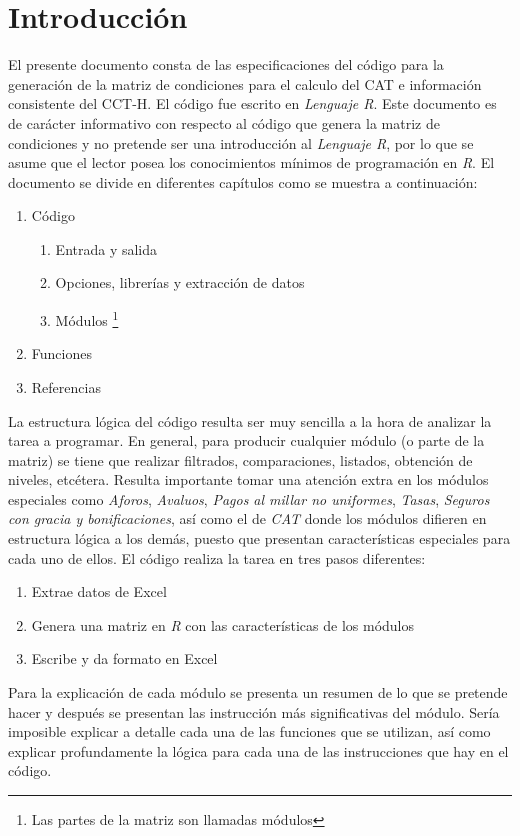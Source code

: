 \documentclass{report}
\begin{document}
\chapter{Introducción} 
% 
El presente documento consta de las especificaciones del código para la generación de la matriz de condiciones para el calculo del CAT e información consistente del CCT-H. El código fue escrito en \textit{Lenguaje R}. 
Este documento es de carácter informativo con respecto al código que genera la matriz de condiciones y no pretende ser una introducción al \textit{Lenguaje R}, por lo que se asume que el lector posea los conocimientos mínimos de programación en \textit{R}. El documento se divide en diferentes capítulos como se muestra a continuación:
\begin{enumerate}
    \item Código
    \begin{enumerate}
        \item Entrada y salida
        \item Opciones, librerías y extracción de datos
        \item Módulos \footnote[1]{Las partes de la matriz son llamadas módulos}
    \end{enumerate}
    \item Funciones
    \item Referencias
\end{enumerate}
La estructura lógica del código resulta ser muy sencilla a la hora de analizar la tarea a programar. En general, para producir cualquier módulo (o parte de la matriz) se tiene que realizar filtrados, comparaciones, listados, obtención de niveles, etcétera. Resulta importante tomar una atención extra en los módulos especiales como \textit{Aforos}, \textit{Avaluos}, \textit{Pagos al millar no uniformes}, \textit{Tasas}, \textit{Seguros con gracia y bonificaciones}, así como el de \textit{CAT} donde los módulos difieren en estructura lógica a los demás, puesto que presentan características especiales para cada uno de ellos. El código realiza la tarea en tres pasos diferentes:
\begin{enumerate}
\item Extrae datos de Excel
\item Genera una matriz en \textit{R} con las características de los módulos
\item Escribe y da formato en Excel
\end{enumerate}

Para la explicación de cada módulo se presenta un resumen de lo que se pretende hacer y después se presentan las instrucción más significativas del módulo. Sería imposible explicar a detalle cada una de las funciones que se utilizan, así como explicar profundamente la lógica para cada una de las instrucciones que hay en el código.
\end{document}
